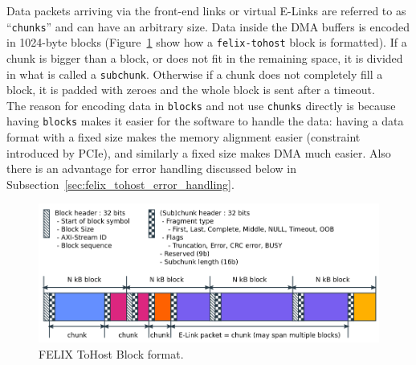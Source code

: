 Data packets arriving via the front-end links or virtual E-Links are referred to as “\texttt{chunks}” and can have an arbitrary size. Data inside the \acs{DMA} buffers is encoded in 1024-byte blocks (Figure~\ref{fig:block-format} show how a \texttt{felix-tohost} block is formatted). If a chunk is bigger than a block, or does not fit in the remaining space, it is divided in what is called a \texttt{subchunk}. Otherwise if a chunk does not completely fill a block, it is padded with zeroes and the whole block is sent after a timeout.\\
The reason for encoding data in \texttt{blocks} and not use \texttt{chunks} directly is because having \texttt{blocks} makes it easier for the software to handle the data: having a data format with a fixed size makes the memory alignment easier (constraint introduced by \acs{PCIe}), and similarly a fixed size makes \acs{DMA} much easier. Also there is an advantage for error handling discussed below in Subsection~\ref{sec:felix_tohost_error_handling}.

\begin{figure}[htbp]
\centering
\includegraphics[width=textwidth]{images/felix/block-data-format.png}
\caption[ToHost Block data format]{\acs{FELIX} ToHost Block format.}
\label{fig:block-format}
\end{figure}


